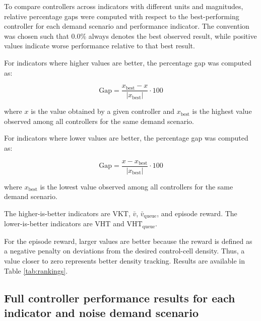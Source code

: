 To compare controllers across indicators with different units and magnitudes,
relative percentage gaps were computed with respect to the best-performing
controller for each demand scenario and performance indicator. The convention
was chosen such that \(0.0\%\) always denotes the best observed result, while
positive values indicate worse performance relative to that best result.

For indicators where higher values are better, the percentage gap was computed
as:

\begin{equation}
    \mathrm{Gap}
    =
    \frac{x_{\mathrm{best}} - x}{|x_{\mathrm{best}}|}
    \cdot 100
\end{equation}

where \(x\) is the value obtained by a given controller and
\(x_{\mathrm{best}}\) is the highest value observed among all controllers for
the same demand scenario.

For indicators where lower values are better, the percentage gap was computed
as:

\begin{equation}
    \mathrm{Gap}
    =
    \frac{x - x_{\mathrm{best}}}{|x_{\mathrm{best}}|}
    \cdot 100
\end{equation}

where \(x_{\mathrm{best}}\) is the lowest value observed among all controllers
for the same demand scenario.

The higher-is-better indicators are \(\mathrm{VKT}\), \(\bar{v}\),
\(\bar{v}_{\mathrm{queue}}\), and episode reward. The lower-is-better indicators
are \(\mathrm{VHT}\) and \(\mathrm{VHT}_{\mathrm{queue}}\).

For the episode reward, larger values are better because the reward is defined
as a negative penalty on deviations from the desired control-cell density. Thus,
a value closer to zero represents better density tracking. Results are available in Table \ref{tab:rankings}.

\clearpage

\subsection{Full controller performance results for each indicator and noise demand scenario
}



